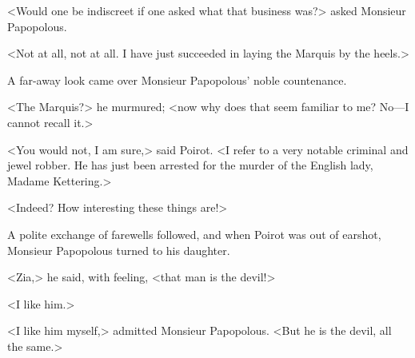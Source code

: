 <Would one be indiscreet if one asked what that business was?> asked Monsieur Papopolous.

<Not at all, not at all. I have just succeeded in laying the Marquis by the heels.>

A far-away look came over Monsieur Papopolous' noble countenance.

<The Marquis?> he murmured; <now why does that seem familiar to me? No—I cannot recall it.>

<You would not, I am sure,> said Poirot. <I refer to a very notable criminal and jewel robber. He has just been arrested for the murder of the English lady, Madame Kettering.>

<Indeed? How interesting these things are!>

A polite exchange of farewells followed, and when Poirot was out of earshot, Monsieur Papopolous turned to his daughter.

<Zia,> he said, with feeling, <that man is the devil!>

<I like him.>

<I like him myself,> admitted Monsieur Papopolous. <But he is the devil, all the same.>